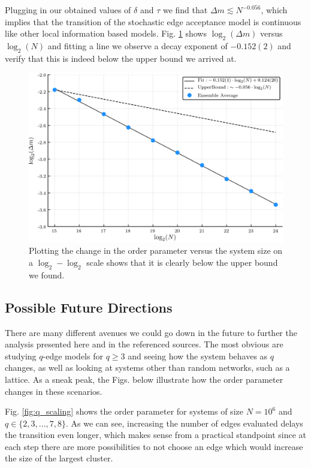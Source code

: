 Plugging in our obtained values of $\delta$ and $\tau$ we find that $\Delta m \lesssim N^{-0.056}$, which implies that the transition of the stochastic edge acceptance model is continuous like other local information based models.
Fig. \ref{fig:delta_m_scaling} shows $\log_2(\Delta m)$ versus $\log_2(N)$ and fitting a line we observe a decay exponent of $-0.152(2)$ and verify that this is indeed below the upper bound we arrived at.

\begin{figure}[H]
	\centering
	\includegraphics[width=350pt, clip]{images/delta_m_scaling.png}
	\caption{Plotting the change in the order parameter versus the system size on a $\log_2-\log_2$ scale shows that it is clearly below the upper bound we found.}
	\label{fig:delta_m_scaling}
\end{figure}



\subsection{Possible Future Directions}
There are many different avenues we could go down in the future to further the analysis presented here and in the referenced sources.
The most obvious are studying $q$-edge models for $q \ge 3$ and seeing how the system behaves as $q$ changes, as well as looking at systems other than random networks, such as a lattice.
As a sneak peak, the Figs. below illustrate how the order parameter changes in these scenarios.

Fig. \ref{fig:q_scaling} shows the order parameter for systems of size $N = 10^6$ and $q \in \{2, 3, ..., 7, 8\}$. As we can see, increasing the number of edges evaluated delays the transition even longer, which makes sense from a practical standpoint since at each step there are more possibilities to not choose an edge which would increase the size of the largest cluster.

